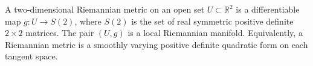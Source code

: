 A two-dimensional Riemannian metric on an open set $U \subset \mathbb{R}^2$ is a differentiable map $g: U \to S(2)$, where $S(2)$ is the set of real symmetric positive definite $2 \times 2$ matrices. The pair $(U, g)$ is a local Riemannian manifold. Equivalently, a Riemannian metric is a smoothly varying positive definite quadratic form on each tangent space.